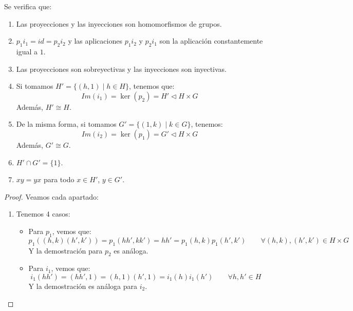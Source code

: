\begin{prop}\label{prop:propiedades_proy_iny}
    Se verifica que:
    \begin{enumerate}
        \item Las proyecciones y las inyecciones son homomorfismos de grupos.
        \item $p_1i_1 = id = p_2i_2$ y las aplicaciones $p_1i_2$ y $p_2i_1$ son la aplicación constantemente igual a $1$.
        \item Las proyecciones son sobreyectivas y las inyecciones son inyectivas.
        \item Si tomamos $H' = \{(h,1) \mid h\in H\}$, tenemos que:
            \begin{equation*}
                Im(i_1) = \ker(p_2) = H' \lhd H\times G
            \end{equation*}
            Además, $H'\cong H$.
        \item De la misma forma, si tomamos $G' = \{(1,k) \mid k\in G\}$, tenemos:
            \begin{equation*}
                Im(i_2) = \ker(p_1) = G' \lhd H\times G
            \end{equation*}
            Además, $G'\cong G$.
        \item $H'\cap G' = \{1\}$.
        \item $xy = yx$ para todo $x\in H'$, $y\in G'$.
    \end{enumerate}
    \begin{proof} 
        Veamos cada apartado:
        \begin{enumerate}
            \item Tenemos 4 casos:
                \begin{itemize}
                    \item Para $p_1$, vemos que:
                        \begin{equation*}
                            p_1((h,k)(h',k')) = p_1(hh',kk') = hh' = p_1(h,k)p_1(h',k') \qquad \forall (h,k),(h',k')\in H\times G
                        \end{equation*}
                        Y la demostración para $p_2$ es análoga.
                    \item Para $i_1$, vemos que:
                        \begin{equation*}
                            i_1(hh') = (hh',1) = (h,1)(h',1) = i_1(h)i_1(h') \qquad \forall h,h'\in H
                        \end{equation*}
                        Y la demostración es análoga para $i_2$.

\end{itemize}
\end{enumerate}
\end{proof}
\end{prop}
